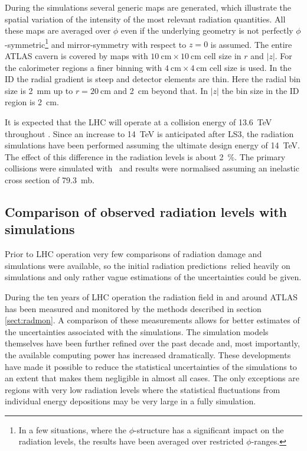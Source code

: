 \documentclass[cernpreprint, atlasdraft=false, UKenglish,british,orcidlogo, texmf, orcidlogo]{atlasdoc}
\begin{document}
During the simulations several generic maps are generated, which illustrate the spatial variation of the intensity of the
most relevant radiation quantities.
All these maps are averaged over $\phi$ even if the underlying geometry is not perfectly
$\phi$-symmetric\footnote{In a few situations, where the $\phi$-structure has a significant
impact on the radiation levels, the  results have been averaged over restricted $\phi$-ranges.}
and mirror-symmetry with respect to $z=0$ is assumed.
The entire ATLAS cavern is covered by maps with $\SI{10}{\cm} \times \SI{10}{\cm}$ 
cell size in $r$ and $|z|$.
For the calorimeter regions a finer binning with $\SI{4}{\cm}\times\SI{4}{\cm}$ 
cell size is used. In the \gls{ID}
the radial gradient is steep and detector elements are thin. Here the radial bin size is \SI{2}{\mm} up to $r=\SI{20}{\cm}$ and
\SI{2}{\cm} beyond that. In $|z|$ the bin size in the \gls{ID} region is \SI{2}{\cm}.
 
It is expected that the \gls{LHC} will operate at a collision energy of \SI{13.6}{\TeV} throughout \RunThr. Since an
increase to \SI{14}{\TeV} is anticipated after \gls{LS3}, the radiation simulations have been performed assuming the ultimate design energy of \SI{14}{\TeV}.
The effect of this difference in the radiation levels is about \SI{2}{\percent}.
The primary \pp collisions were
simulated with \,\cite{Sjostrand:2014zea} and results were normalised assuming an
inelastic cross section of \SI{79.3}{mb}.
 
\subsection{Comparison of observed radiation levels with simulations}
\label{sect:radsimcomp}
 
Prior to \gls{LHC} operation very few comparisons of radiation damage and simulations were available, so
the initial radiation predictions\,\cite{PERF-2007-01} relied heavily on simulations and only
rather vague estimations of the uncertainties could be given.
 
During the ten years of \gls{LHC} operation the radiation field in and around ATLAS has been measured and monitored by
the methods described in section\,\ref{sect:radmon}. A comparison of these measurements allows for better estimates of the uncertainties associated with the simulations.
The simulation models themselves have been further refined over the past decade and, most importantly, the
available computing power has increased dramatically. These developments have made it possible to
reduce the statistical uncertainties of the simulations to an extent that makes them negligible in almost
all cases. The only exceptions are regions with very low radiation levels where the statistical fluctuations from individual energy depositions
may be very large in a fully \analog simulation.
 
\end{document}
